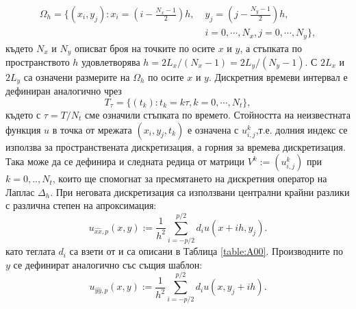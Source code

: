\documentclass{article}
\begin{document}
\begin{align}
\Omega_h = \{(x_i,y_j): x_i = (i-\frac{N_x-1}{2})h, \; &y_j = (j-\frac{N_y-1}{2})h, \nonumber\\
                                         & i = 0,\cdots, N_x, j = 0 ,\cdots , N_y \},
\end{align}
където $N_x$ и $N_y$ описват броя на точките по осите $x$ и $y$, а стъпката по пространството $h$ удовлетворява $h =2 L_x/(N_x-1) =2 L_y/(N_y-1)$.
С $2 L_x$ и $2 L_y$ са означени размерите на $\Omega_h$ по осите $x$ и $y$. Дискретния времеви интервал е дефиниран аналогично чрез
$$
T_{\tau} = \{(t_k): t_k = k\tau, k = 0,\cdots ,N_t \},
$$
където с $\tau = T/N_t$ сме означили стъпката по времето. Стойността на неизвестната функция $u$ в точка от мрежата $(x_i,y_j,t_k)$ е означена с $u_{i,j}^k$,т.е. долния индекс се използва за пространствената дискретизация, а горния за времева дискретизация. Така може да се дефинира и следната редица от матрици $V^k := (u_{i,j}^k)$ при $k=0,..,N_t$, които ще спомогнат за пресмятането на дискретния оператор на Лаплас $\Delta_h$. При неговата дискретизация са използвани централни крайни разлики с различна степен на апроксимация:
\begin{equation}\label{fdx}
u_{\widehat{xx},p}(x,y) :=  \frac{1}{h^2} \sum\limits_{i=-p/2}^{p/2} d_i u(x+ih, y_j).
\end{equation}
като теглата $d_i$ са взети от \cite{forn} и са описани в Таблица \ref{table:A00}. Производните по $y$ се дефинират аналогично със същия шаблон:
\begin{equation}\label{fdy}
u_{\widehat{yy},p}(x,y) :=  \frac{1}{h^2} \sum\limits_{i=-p/2}^{p/2} d_i u(x, y_j+ih).
\end{equation}
\end{document}

